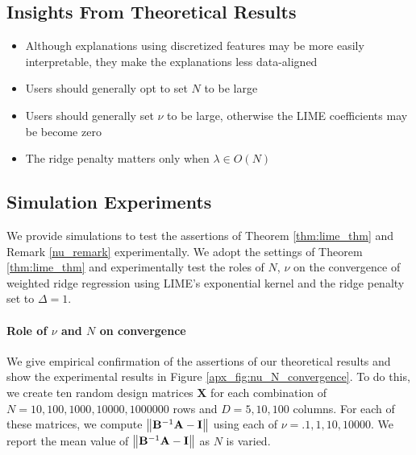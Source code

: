 \documentclass[mnsc,blindrev]{informs3}
\newcommand{\bA}{\mathbf{A}}
\newcommand{\bB}{\mathbf{B}}
\begin{document}
            
        \subsection*{Insights From Theoretical Results}
            \begin{itemize}
                \item Although explanations using discretized features may be more easily interpretable, they make the explanations less data-aligned
                \item Users should generally opt to set $N$ to be large 
                \item Users should generally set $\nu$ to be large, otherwise the LIME coefficients may be become zero
                \item The ridge penalty matters only when $\lambda \in O(N)$
            \end{itemize}
    
            \subsection*{Simulation Experiments}
                \label{apx_sec:simulation_experiments}
                We provide simulations to test the assertions of Theorem \ref{thm:lime_thm} and Remark \ref{nu_remark} experimentally. We adopt the settings of Theorem \ref{thm:lime_thm} and experimentally test the roles of $N$, $\nu$ on the convergence of weighted ridge regression using LIME's exponential kernel and the ridge penalty set to $\Delta=1$.%
    

                
                \paragraph{Role of $\nu$ and $N$ on convergence}
                    We give empirical confirmation of the assertions of our theoretical results and show the experimental results in Figure \ref{apx_fig:nu_N_convergence}. To do this, we create ten random design matrices $\mathbf{X}$ for each combination of $N=10,100,1000,10000,1000000$ rows and $D=5,10,100$ columns. For each of these matrices, we compute $\norm{\bB^{-1}\bA - \mathbf{I}}$ using each of $\nu=.1,1,10,10000$. We report the mean value of $\norm{\bB^{-1}\bA - \mathbf{I}}$ as $N$ is varied.
\end{document}
